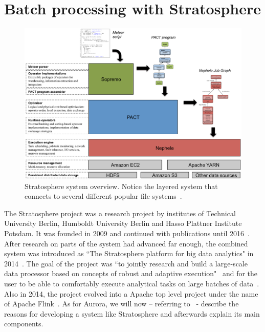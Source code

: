\section{Batch processing with Stratosphere}\label{stratosphere}

\begin{figure}
\centering
\includegraphics[width=7.0in]{./img/StratosphereSystemOverview.png}
\caption{Stratosphere system overview. Notice the layered system that connects to several different popular file systems~\cite{Stratosphere2014}.}
\label{fig_stratosphere_overview}
\end{figure}

The Stratosphere project was a research project by institutes of Technical University Berlin, Humboldt University Berlin and Hasso Plattner Institute Potsdam. It was founded in 2009 and continued with publications until 2016~\cite{StratospherePublications}. After research on parts of the system had advanced far enough, the combined system was introduced as ``The Stratosphere platform for big data analytics" in 2014~\cite{Stratosphere2014}. The goal of the project was ``to jointly research and build a large-scale data processor based on concepts of robust and adaptive execution"~\cite{StratosphereDIMA} and for the user to be able to comfortably execute analytical tasks on large batches of data~\cite{Stratosphere2014}. Also in 2014, the project evolved into a Apache top level project under the name of Apache Flink~\cite{StratospherePublications}. As for Aurora, we will now – referring to~\cite{Stratosphere2014} - describe the reasons for developing a system like Stratosphere and afterwards explain its main components.


